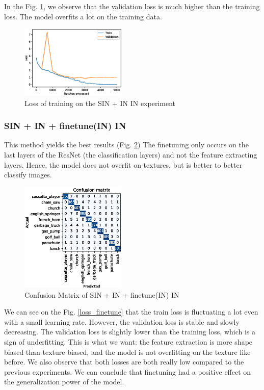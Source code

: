 \documentclass{article}
\begin{document}
In the Fig. \ref{loss_sinin}, we observe that the validation loss is much higher than the training
loss. The model overfits a lot on the training data.


\begin{figure}[h!]
  \includegraphics[width = 0.45\textwidth]{imgs/sinin/loss.eps}
  \caption{Loss of training on the SIN + IN \texorpdfstring{\textrightarrow} .IN experiment}
  \label{loss_sinin}
\end{figure}

\subsubsection{SIN + IN + finetune(IN) \texorpdfstring{\textrightarrow} .IN}

This method yields the best results (Fig. \ref{cm_sinin-in-finetune}) The finetuning only occurs
on the last layers of the ResNet (the classification layers) and not the feature extracting layers.
Hence, the model does not overfit on textures, but is better to better classify images.

\begin{figure}[h!]
  \includegraphics[width = 0.45\textwidth]{imgs/sinin/finetune/fine_tune_confusion_matrix_0.974.eps}
  \caption{Confusion Matrix of SIN + IN + finetune(IN) \texorpdfstring{\textrightarrow} .IN}
  \label{cm_sinin-in-finetune}
\end{figure}



We can see on the Fig. \ref{loss_finetune} that the train loss is fluctuating a lot even with a small
learning rate. However, the validation loss is stable and slowly decreasing.
The validation loss is slightly lower than the training loss, which is a sign of underfitting. This is what we want:
the feature extraction is more shape biased than texture biased, and the model is not overfitting on the texture like
before.
We also observe that both losses are both really low compared to the previous experiments. 
We can conclude that finetuning had a positive effect on the generalization power of the model.
\end{document}
